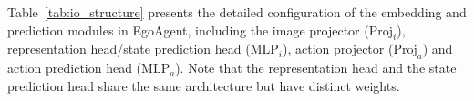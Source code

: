 \begin{table}[ht]
  \centering
  \caption{Architecture configurations of EgoAgent.}
  \label{tab:arch}%
\end{table}%

Table~\ref{tab:io_structure} presents the detailed configuration of the embedding and prediction modules in EgoAgent, including the image projector ($\text{Proj}_i$), representation head/state prediction head ($\text{MLP}_i$), action projector ($\text{Proj}_a$) and action prediction head ($\text{MLP}_a$).
Note that the representation head and the state prediction head share the same architecture but have distinct weights.


